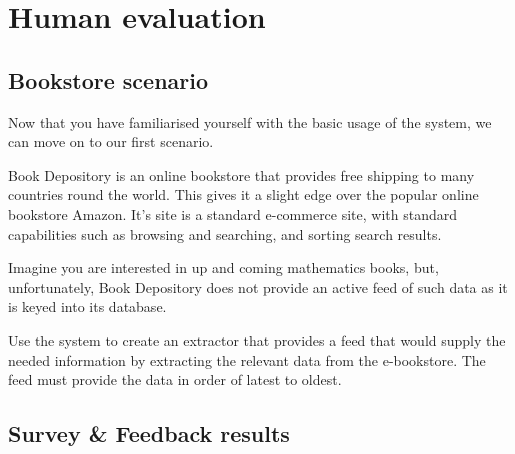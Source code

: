 \documentclass[urop]{socreport}
\begin{document}
\listoffigures 
\listoftables
\tableofcontents 











\newpage
\appendix
\chapter{Human evaluation}
\section{Bookstore scenario}

Now that you have familiarised yourself with the basic usage of the system,
we can move on to our first scenario.

Book Depository is an online bookstore that provides free shipping to many
countries round the world. This gives it a slight edge over the popular
online bookstore Amazon. It's site is a standard e-commerce site, with standard
capabilities such as browsing and searching, and sorting search results.

Imagine you are interested in up and coming mathematics books, but,
unfortunately, Book Depository does not provide an active feed of
such data as it is keyed into its database.

Use the system to create an extractor that provides a feed that would
supply the needed information by extracting the relevant data from the
e-bookstore. The feed must provide the data in order of latest to oldest.
\newpage
\section{Survey \& Feedback results}

\end{document}
